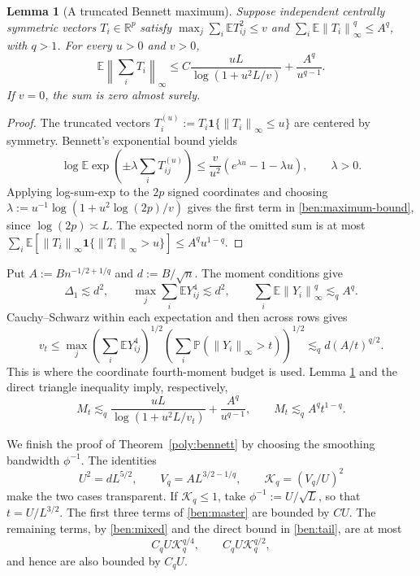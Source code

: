 \documentclass[11pt,letterpaper]{article}
\newtheorem{lemma}{Lemma}
\theoremstyle{remark}
\newcommand{\E}{\mathbb E}
\newcommand{\Pp}{\mathbb P}
\newcommand{\R}{\mathbb R}
\newcommand{\norm}[1]{\left\lVert#1\right\rVert}
\newcommand{\ind}{\mathbf 1}
\begin{document}
\begin{lemma}[A truncated Bennett maximum]\label{ben:maximum}
Suppose independent centrally symmetric vectors \(T_i\in\R^p\)
satisfy \(\max_j\sum_i\E T_{ij}^2\le v\) and
\(\sum_i\E\norm{T_i}_\infty^q\le A^q\), with \(q>1\).
For every \(u>0\) and \(v>0\),
\begin{equation}
 \E\norm{\sum_iT_i}_\infty
 \le C\frac{uL}{\log(1+u^2L/v)}+\frac{A^q}{u^{q-1}}.
 \label{ben:maximum-bound}
\end{equation}
If \(v=0\), the sum is zero almost surely.
\end{lemma}
\begin{proof}
The truncated vectors \(T_i^{(u)}:=T_i\ind\{\norm{T_i}_\infty\le u\}\)
are centered by symmetry. Bennett's exponential bound yields
\[
 \log\E\exp\left(\pm\lambda\sum_iT_{ij}^{(u)}\right)
 \le\frac v{u^2}(e^{\lambda u}-1-\lambda u),\qquad\lambda>0.
\]
Applying log-sum-exp to the \(2p\) signed coordinates and choosing
\(\lambda:=u^{-1}\log(1+u^2\log(2p)/v)\) gives the first term in
\eqref{ben:maximum-bound}, since \(\log(2p)\asymp L\).
The expected norm of the omitted sum is at most
\(\sum_i\E[\norm{T_i}_\infty\ind\{\norm{T_i}_\infty>u\}]
\le A^qu^{1-q}\).
\end{proof}

Put \(A:=Bn^{-1/2+1/q}\) and \(d:=B/\sqrt n\). The moment
conditions give
\[
 \Delta_1\lesssim d^2,\qquad
 \max_j\sum_i\E Y_{ij}^4\lesssim d^2,\qquad
 \sum_i\E\norm{Y_i}_\infty^q\lesssim_q A^q.
\]
Cauchy--Schwarz within each expectation and then across rows gives
\begin{equation}
 v_t\le
 \max_j\left(\sum_i\E Y_{ij}^4\right)^{1/2}
       \left(\sum_i\Pp(\norm{Y_i}_\infty>t)\right)^{1/2}
 \lesssim_q d(A/t)^{q/2}.
 \label{ben:mixed}
\end{equation}
This is where the coordinate fourth-moment budget is used. Lemma
\ref{ben:maximum} and the direct triangle inequality imply, respectively,
\begin{equation}
 M_t\lesssim_q\frac{uL}{\log(1+u^2L/v_t)}+\frac{A^q}{u^{q-1}},
 \qquad M_t\lesssim_q A^qt^{1-q}.
 \label{ben:tail}
\end{equation}

We finish the proof of Theorem~\ref{poly:bennett} by choosing the
smoothing bandwidth \(\phi^{-1}\). The identities
\[
 U^2=dL^{5/2},\qquad V_q=AL^{3/2-1/q},\qquad
 \mathcal K_q=(V_q/U)^2
\]
make the two cases transparent. If \(\mathcal K_q\le1\), take
\(\phi^{-1}:=U/\sqrt L\), so that \(t=U/L^{3/2}\).
The first three terms of \eqref{ben:master} are bounded by \(CU\).
The remaining terms, by \eqref{ben:mixed} and the direct bound in
\eqref{ben:tail}, are at most
\[
 C_qU \mathcal K_q^{q/4},\qquad C_qU \mathcal K_q^{q/2},
\]
and hence are also bounded by \(C_qU\).
\end{document}
